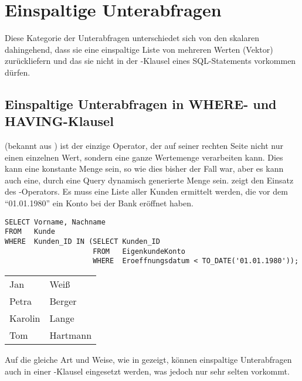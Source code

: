     \section{Einspaltige Unterabfragen}
      Diese Kategorie der Unterabfragen unterschiedet sich von den skalaren dahingehend, dass sie eine einspaltige Liste von mehreren Werten (Vektor) zur\"uckliefern und das sie nicht in der \SELECT-Klausel eines SQL-Statements vorkommen d\"urfen.
      \subsection{Einspaltige Unterabfragen in WHERE- und HAVING-Klausel}
         (bekannt aus ) ist der einzige Operator, der auf seiner rechten Seite nicht nur einen einzelnen Wert, sondern eine ganze Wertemenge verarbeiten kann. Dies kann eine konstante Menge sein, so wie dies bisher der Fall war, aber es kann auch eine, durch eine Query dynamisch generierte Menge sein.  zeigt den Einsatz des -Operators. Es muss eine Liste aller Kunden ermittelt werden, die vor dem \enquote{01.01.1980} ein Konto bei der Bank er\"offnet haben.
        \begin{lstlisting}[language=oracle_sql,caption={\languageorasql{IN} mit Unterabfrage},label=sql06_07]
SELECT Vorname, Nachname
FROM   Kunde
WHERE  Kunden_ID IN (SELECT Kunden_ID
                     FROM   EigenkundeKonto
                     WHERE  Eroeffnungsdatum < TO_DATE('01.01.1980'));
        \end{lstlisting}
        \begin{center}
          \begin{small}
            \tablehead{}
            \begin{msoraclesql}
              \begin{supertabular}{ll}
									Jan & Wei\ss{} \\
									Petra & Berger \\
									Karolin & Lange \\
									Tom & Hartmann \\
								\end{supertabular}
            \end{msoraclesql}
          \end{small}
        \end{center}
        Auf die gleiche Art und Weise, wie in  gezeigt, k\"onnen einspaltige Unterabfragen auch in einer \HAVING-Klausel eingesetzt werden, was jedoch nur sehr selten vorkommt.
